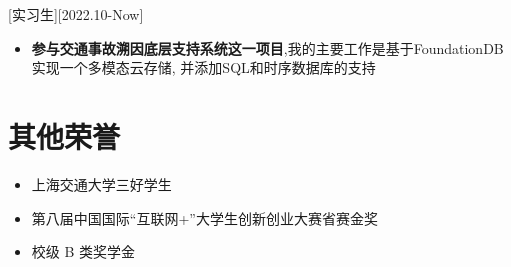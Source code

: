 \documentclass{resume}
\begin{document}
[实习生][2022.10-Now] 
\begin{itemize}
  \item \textbf{参与交通事故溯因底层支持系统这一项目},我的主要工作是基于FoundationDB实现⼀个多模态云存储, 并添加SQL和时序数据库的⽀持
\end{itemize}

\section{其他荣誉}
\begin{itemize}
  \item 上海交通大学三好学生  
  \item 第八届中国国际“互联网+”大学生创新创业大赛省赛金奖
  \item 校级 B 类奖学金
\end{itemize}
\end{document}
